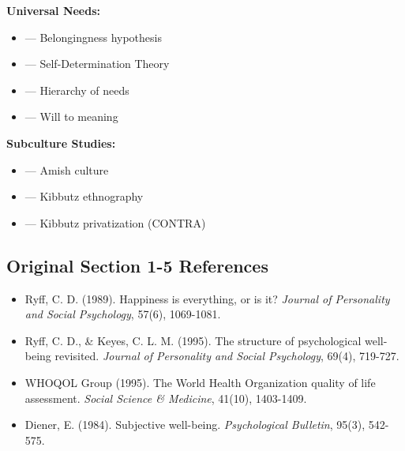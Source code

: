 \textbf{Universal Needs:}
\begin{itemize}[nosep]
\item \cite{baumeister1995need} --- Belongingness hypothesis
\item \cite{deci2000what} --- Self-Determination Theory
\item \cite{maslow1943theory} --- Hierarchy of needs
\item \cite{frankl1959mans} --- Will to meaning
\end{itemize}

\textbf{Subculture Studies:}
\begin{itemize}[nosep]
\item \cite{kraybill2001riddle} --- Amish culture
\item \cite{spiro1970kibbutz} --- Kibbutz ethnography
\item \cite{gavron2000kibbutz} --- Kibbutz privatization (CONTRA)
\end{itemize}

\subsection*{Original Section 1-5 References}

\begin{itemize}[nosep]
\item Ryff, C. D. (1989). Happiness is everything, or is it? \textit{Journal of Personality and Social Psychology}, 57(6), 1069-1081.
\item Ryff, C. D., \& Keyes, C. L. M. (1995). The structure of psychological well-being revisited. \textit{Journal of Personality and Social Psychology}, 69(4), 719-727.
\item WHOQOL Group (1995). The World Health Organization quality of life assessment. \textit{Social Science \& Medicine}, 41(10), 1403-1409.
\item Diener, E. (1984). Subjective well-being. \textit{Psychological Bulletin}, 95(3), 542-575.
\end{itemize}

\nocite{bcm_master}
\nocite{markus1991culture, triandis1995individualism, inglehart2005modernization}
\nocite{kitayama2006cultural, oishi1999cross, suh1998subjective, lu2004culture}
\nocite{tay2011needs, joshanloo2014eastern, springer2006assessment}
\nocite{sahlins1972stone, polanyi1944great, graeber2011debt}
\nocite{woodburn1982egalitarian, birddavid1992giving, lee1979kung, everett2008dont}
\nocite{kaplan2000theory, gurven2007longevity}
\nocite{kraybill2001riddle, heilman1992defenders, spiro1970kibbutz}
\nocite{kanter1972commitment, dominguez1992your, schor1998overspent}
\nocite{gavron2000kibbutz, zablocki1980alienation}
\nocite{baumeister1995need, deci2000what, dunbar2010how}
\nocite{maslow1943theory, frankl1959mans, steger2006meaning}
\nocite{marlowe2010hadza, turnbull1961forest, chagnon1968yanomamo, malinowski1922argonauts}



